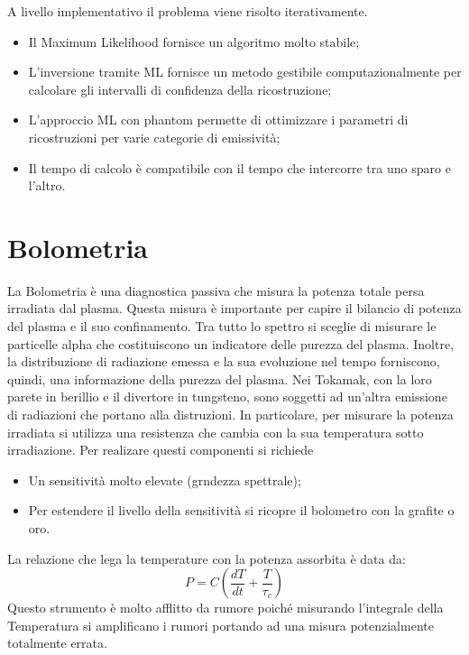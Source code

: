 \documentclass{article}
\begin{document}
A livello implementativo il problema viene risolto iterativamente.
\begin{itemize}
    \item Il Maximum Likelihood fornisce un algoritmo molto stabile;
    \item L'inversione tramite ML fornisce un metodo gestibile computazionalmente per calcolare gli intervalli di confidenza della ricostruzione;
    \item L'approccio ML con phantom permette di ottimizzare i parametri di ricostruzioni per varie categorie di emissività;
    \item Il tempo di calcolo è compatibile con il tempo che intercorre tra uno sparo e l'altro.
\end{itemize}
\section{Bolometria}
La Bolometria è una diagnostica passiva che misura la potenza totale persa irradiata dal plasma. Questa misura è importante per capire il bilancio di potenza del plasma e il suo confinamento.\newline
Tra tutto lo spettro si sceglie di misurare le particelle alpha che costituiscono un indicatore delle purezza del plasma. Inoltre, la distribuzione di radiazione emessa e la sua evoluzione nel tempo forniscono, quindi, una informazione della purezza del plasma.\newline
Nei Tokamak, con la loro parete in berillio e il divertore in tungsteno, sono soggetti ad un'altra emissione di radiazioni che portano alla distruzioni.\newline
In particolare, per misurare la potenza irradiata si utilizza una resistenza che cambia con la sua temperatura sotto irradiazione. Per realizare questi componenti si richiede\begin{itemize}
    \item Un sensitività molto elevate (grndezza spettrale);
    \item Per estendere il livello della sensitività si ricopre il bolometro con la grafite o oro.
\end{itemize}
La relazione che lega la temperature con la potenza assorbita è data da:
\begin{equation*}
    P=C(\frac{dT}{dt}+\frac{T}{\tau_{c}})
\end{equation*}
Questo strumento è molto afflitto da rumore poiché misurando l'integrale della Temperatura si amplificano i rumori portando ad una misura potenzialmente totalmente errata.
\end{document}
